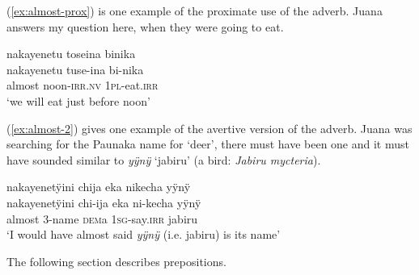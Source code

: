 (\ref{ex:almost-prox}) is one example of the proximate use of the adverb. Juana answers my question here, when they were going to eat.

\ea\label{ex:almost-prox}
\begingl
\glpreamble nakayenetu toseina binika\\
\gla nakayenetu tuse-ina bi-nika\\
\glb almost noon-\textsc{irr.nv} 1\textsc{pl}-eat.\textsc{irr}\\
\glft ‘we will eat just before noon’
\endgl
\trailingcitation{[jxx-p110923l-2.099]}
\xe

(\ref{ex:almost-2}) gives one example of the avertive version of the adverb. Juana was searching for the Paunaka name for ‘deer’, there must have been one and it must have sounded similar to \textit{yÿnÿ} ‘jabiru’ (a bird: \textit{Jabiru mycteria}).

\ea\label{ex:almost-2}
\begingl
\glpreamble nakayenetÿini chija eka nikecha yÿnÿ\\
\gla nakayenetÿini chi-ija eka ni-kecha yÿnÿ\\
\glb almost 3-name \textsc{dem}a 1\textsc{sg}-say.\textsc{irr} jabiru\\
\glft ‘I would have almost said \textit{yÿnÿ} (i.e. jabiru) is its name’
\endgl
\trailingcitation{[jxx-a120516l-a.240-241]}
\xe
{}



The following section describes prepositions.




